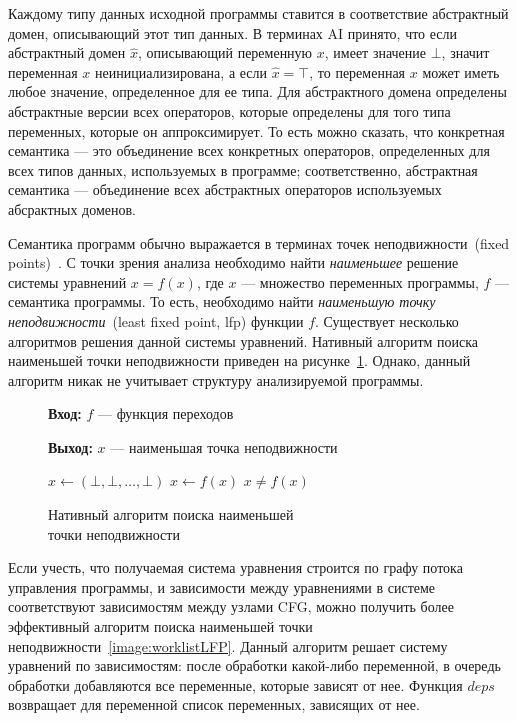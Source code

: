 Каждому типу данных исходной программы ставится в соответствие абстрактный
домен, описывающий этот тип данных. В терминах AI принято, что если абстрактный
домен $\hat{x}$, описывающий переменную $x$, имеет значение $\bot$, значит 
переменная $x$ неинициализирована, а если $\hat{x} = \top$, то переменная $x$
может иметь любое значение, определенное для ее типа. Для абстрактного домена
определены абстрактные версии всех операторов, которые определены для того
типа переменных, которые он аппроксимирует. То есть можно сказать, что 
конкретная семантика --- это объединение всех конкретных операторов, 
определенных для всех типов данных, используемых в программе; соответственно,
абстрактная семантика --- объединение всех абстрактных операторов используемых 
абсрактных доменов.

Семантика программ обычно выражается в терминах точек неподвижности~(fixed 
points)~\cite{fixedPoint}. С точки зрения анализа необходимо найти
\emph{наименьшее} решение системы уравнений $x = f(x)$, где $x$ --- множество
переменных программы, $f$ --- семантика программы. То есть, необходимо найти
\emph{наименьшую точку неподвижности}~(least fixed point, lfp) функции $f$.
Существует несколько алгоритмов решения данной системы уравнений. Нативный
алгоритм поиска наименьшей точки неподвижности приведен на 
рисунке~\ref{image:nativeLFP}. Однако, данный алгоритм никак не учитывает 
структуру анализируемой программы.

\begin{figure}[h!]
\textbf{Вход:} $f$ --- функция переходов

\textbf{Выход:} $x$ --- наименьшая точка неподвижности

\begin{algorithmic} 
\State $x \gets (\bot, \bot, \ldots, \bot)$ 
\Repeat 
	\State $x \gets f(x)$ 
\Until $x \ne f(x)$ 
\end{algorithmic}

\caption{Нативный алгоритм поиска наименьшей\\точки неподвижности}
\label{image:nativeLFP}
\end{figure}

Если учесть, что получаемая система уравнения строится по графу потока 
управления программы, и зависимости между уравнениями в системе соответствуют
зависимостям между узлами CFG, можно получить более эффективный алгоритм поиска
наименьшей точки неподвижности~\ref{image:worklistLFP}. Данный алгоритм решает
систему уравнений по зависимостям: после обработки какой-либо переменной,
в очередь обработки добавляются все переменные, которые зависят от нее. Функция
$deps$ возвращает для переменной список переменных, зависящих от нее.

